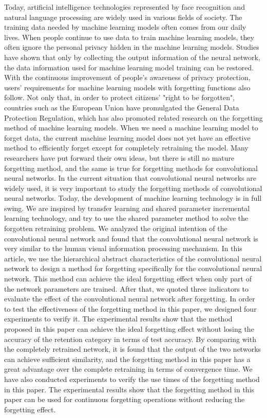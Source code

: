 \begin{abstract*}
  Today, artificial intelligence technologies represented by face recognition and natural language processing are widely used in various fields of society. 
  The training data needed by machine learning models often comes from our daily lives.
  When people continue to use data to train machine learning models, they often ignore the personal privacy hidden in the machine learning models.
  Studies have shown that only by collecting the output information of the neural network, the data information used for machine learning model training can be restored. 
  With the continuous improvement of people's awareness of privacy protection, users' requirements for machine learning models with forgetting functions also follow.
  Not only that, in order to protect citizens' "right to be forgotten", countries such as the European Union have promulgated the General Data Protection Regulation, 
  which has also promoted related research on the forgetting method of machine learning models.
  When we need a machine learning model to forget data, the current machine learning model does not yet have an effective method to efficiently forget except for completely retraining the model.
  Many researchers have put forward their own ideas, but there is still no mature forgetting method, and the same is true for forgetting methods for convolutional neural networks. 
  In the current situation that convolutional neural networks are widely used, it is very important to study the forgetting methods of convolutional neural networks.
  Today, the development of machine learning technology is in full swing. We are inspired by transfer learning and shared parameter incremental learning technology, and try to use the shared parameter method to solve the forgotten retraining problem.  
  We analyzed the original intention of the convolutional neural network and found that the convolutional neural network is very similar to the human visual information processing mechanism.
  In this article, we use the hierarchical abstract characteristics of the convolutional neural network to design a method for forgetting specifically for the convolutional neural network. 
  This method can achieve the ideal forgetting effect when only part of the network parameters are trained.
  After that, we quoted three indicators to evaluate the effect of the convolutional neural network after forgetting.
  In order to test the effectiveness of the forgetting method in this paper, we designed four experiments to verify it. 
  The experimental results show that the method proposed in this paper can achieve the ideal forgetting effect without losing the accuracy of the retention category in terms of test accuracy.
  By comparing with the completely retrained network, it is found that the output of the two networks can achieve sufficient similarity, 
  and the forgetting method in this paper has a great advantage over the complete retraining in terms of convergence time.
  We have also conducted experiments to verify the use times of the forgetting method in this paper. 
  The experimental results show that the forgetting method in this paper can be used for continuous forgetting operations without reducing the forgetting effect.

\end{abstract*}
